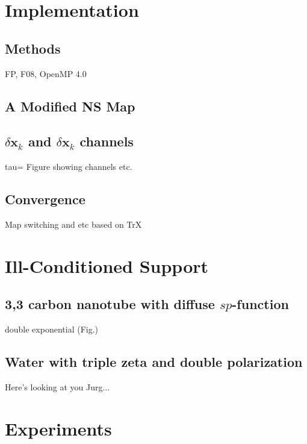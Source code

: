 \documentclass[letterpaper,twocolumn,amsmath,amsfont,amssymb,english,aps,jcp,preprintnumbers,groupaddress,nofootinbib,tightenlines]{revtex4}
\newcommand{\mat}[1]{\boldsymbol{#1}}
\begin{document}
\section{Implementation}

\subsection{Methods}
FP, F08, OpenMP 4.0

\subsection{A Modified NS Map}

\subsection{$\delta \mat{x}_k$ and $\delta \mat{x}_k$ channels}
tau= Figure showing channels etc.  

\subsection{Convergence}
Map switching and etc based on TrX


\section{Ill-Conditioned Support}

\subsection{ 3,3 carbon nanotube with diffuse $sp$-function}
double exponential (Fig.)

\subsection{Water with triple zeta and double polarization}
Here's looking at you Jurg...

\section{Experiments}
\end{document}
